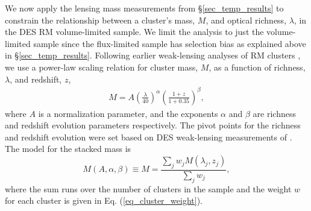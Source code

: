 We now apply the lensing mass measurements from \S\ref{sec_temp_results} to constrain the relationship between a cluster's mass, $M$, and optical richness, $\lambda$, in the DES RM \whichyear{} volume-limited sample. 
We limit the analysis to just the volume-limited sample since the flux-limited sample has selection bias as explained above in \S\ref{sec_temp_results}.
Following earlier weak-lensing analyses of RM clusters \citep{simet18, melchoir17, mcclintock18}, we use a power-law scaling relation for cluster mass, $M$, as a function of richness, $\lambda$, and redshift, $z$,
\begin{eqnarray}
M = A \left(\frac{\lambda}{40}\right)^{\alpha} \left(\frac{1+z}{1+0.35}\right)^{\beta},
\label{eq_ML}
 \end{eqnarray}
 where $A$ is a normalization parameter, and the exponents $\alpha$ and $\beta$ are richness and redshift evolution parameters respectively. 
The pivot points for the richness and redshift evolution were set based on DES weak-lensing measurements of .
The model for the stacked mass is 
\begin{equation}
M(A, \alpha, \beta) \equiv M = \frac{\sum_j w_j M(\lambda_{j}, z_{j})}{\sum_j w_j}, 
\label{eq_model_ML}
\end{equation}
where the sum runs over the number of clusters in the sample and the weight $w$ for each cluster is given in Eq. (\ref{eq_cluster_weight}).

